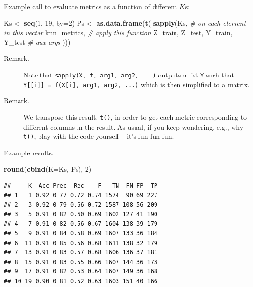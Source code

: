 \documentclass[10pt,b5paper,krantz1]{krantz}
\newenvironment{Shaded}{\begin{snugshade}}{\end{snugshade}}
\newcommand{\CommentTok}[1]{\textcolor[rgb]{0.37,0.37,0.37}{\textit{#1}}}
\newcommand{\DataTypeTok}[1]{\textcolor[rgb]{0.27,0.27,0.27}{#1}}
\newcommand{\DecValTok}[1]{\textcolor[rgb]{0.06,0.06,0.06}{#1}}
\newcommand{\KeywordTok}[1]{\textcolor[rgb]{0.27,0.27,0.27}{\textbf{#1}}}
\newcommand{\NormalTok}[1]{#1}
\newcommand{\StringTok}[1]{\textcolor[rgb]{0.5,0.5,0.5}{#1}}
\begin{document}
Example call to evaluate metrics as a function of different \(K\)s:

\begin{Shaded}
\begin{Highlighting}[]
\NormalTok{Ks <-}\StringTok{ }\KeywordTok{seq}\NormalTok{(}\DecValTok{1}\NormalTok{, }\DecValTok{19}\NormalTok{, }\DataTypeTok{by=}\DecValTok{2}\NormalTok{)}
\NormalTok{Ps <-}\StringTok{ }\KeywordTok{as.data.frame}\NormalTok{(}\KeywordTok{t}\NormalTok{(}
    \KeywordTok{sapply}\NormalTok{(Ks, }\CommentTok{# on each element in this vector}
\NormalTok{        knn_metrics,     }\CommentTok{# apply this function}
\NormalTok{        Z_train, Z_test, Y_train, Y_test }\CommentTok{# aux args}
\NormalTok{    )))}
\end{Highlighting}
\end{Shaded}

\begin{description}
\item[Remark.]
Note that \texttt{sapply(X,\ f,\ arg1,\ arg2,\ ...)}
outputs a list \texttt{Y} such that
\texttt{Y{[}{[}i{]}{]}\ =\ f(X{[}i{]},\ arg1,\ arg2,\ ...)}
which is then simplified to a matrix.
\item[Remark.]
We transpose this result, \texttt{t()}, in order to get each metric
corresponding to different columns in the result.
As usual, if you keep wondering, e.g., why \texttt{t()}, play with
the code yourself -- it's fun fun fun.
\end{description}

Example results:

\begin{Shaded}
\begin{Highlighting}[]
\KeywordTok{round}\NormalTok{(}\KeywordTok{cbind}\NormalTok{(}\DataTypeTok{K=}\NormalTok{Ks, Ps), }\DecValTok{2}\NormalTok{)}
\end{Highlighting}
\end{Shaded}

\begin{verbatim}
##     K  Acc Prec  Rec    F   TN  FN FP  TP
## 1   1 0.92 0.77 0.72 0.74 1574  90 69 227
## 2   3 0.92 0.79 0.66 0.72 1587 108 56 209
## 3   5 0.91 0.82 0.60 0.69 1602 127 41 190
## 4   7 0.91 0.82 0.56 0.67 1604 138 39 179
## 5   9 0.91 0.84 0.58 0.69 1607 133 36 184
## 6  11 0.91 0.85 0.56 0.68 1611 138 32 179
## 7  13 0.91 0.83 0.57 0.68 1606 136 37 181
## 8  15 0.91 0.83 0.55 0.66 1607 144 36 173
## 9  17 0.91 0.82 0.53 0.64 1607 149 36 168
## 10 19 0.90 0.81 0.52 0.63 1603 151 40 166
\end{verbatim}
\end{document}
